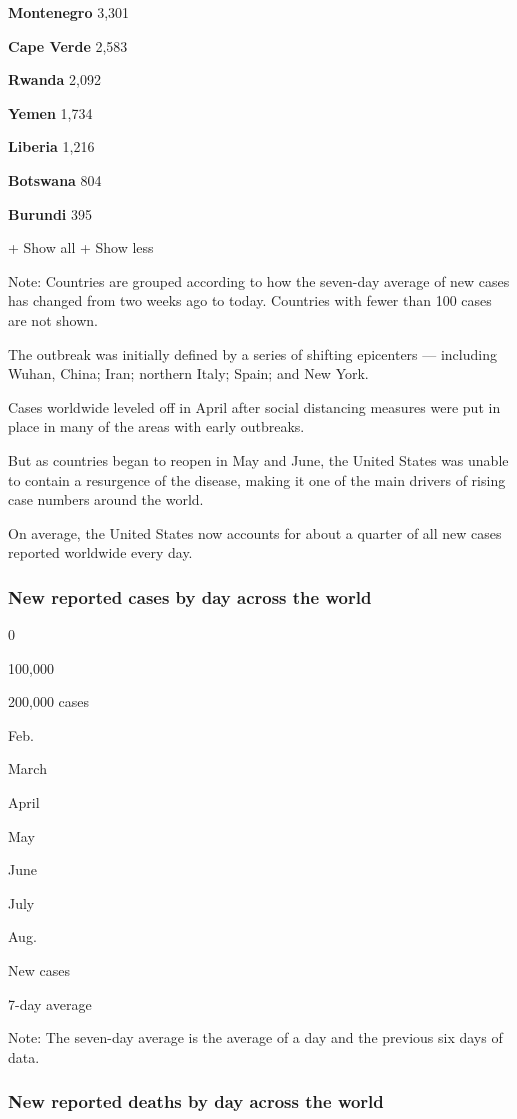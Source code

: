 \textbf{Montenegro} 3,301

\textbf{Cape Verde} 2,583

\textbf{Rwanda} 2,092

\textbf{Yemen} 1,734

\textbf{Liberia} 1,216

\textbf{Botswana} 804

\textbf{Burundi} 395

+ Show all + Show less

Note: Countries are grouped according to how the seven-day average of
new cases has changed from two weeks ago to today. Countries with fewer
than 100 cases are not shown.

The outbreak was initially defined by a series of shifting epicenters
--- including Wuhan, China; Iran; northern Italy; Spain; and New York.

Cases worldwide leveled off in April after social distancing measures
were put in place in many of the areas with early outbreaks.

But as countries began to reopen in May and June, the United States was
unable to contain a resurgence of the disease, making it one of the main
drivers of rising case numbers around the world.

On average, the United States now accounts for about a quarter of all
new cases reported worldwide every day.

\hypertarget{new-reported-cases-by-day-across-the-world}{%
\subsubsection{New reported cases by day across the
world}\label{new-reported-cases-by-day-across-the-world}}

0

100,000

200,000 cases

Feb.

March

April

May

June

July

Aug.

New cases

7-day average

Note: The seven-day average is the average of a day and the previous six
days of data.

\hypertarget{new-reported-deaths-by-day-across-the-world}{%
\subsubsection{New reported deaths by day across the
world}\label{new-reported-deaths-by-day-across-the-world}}


